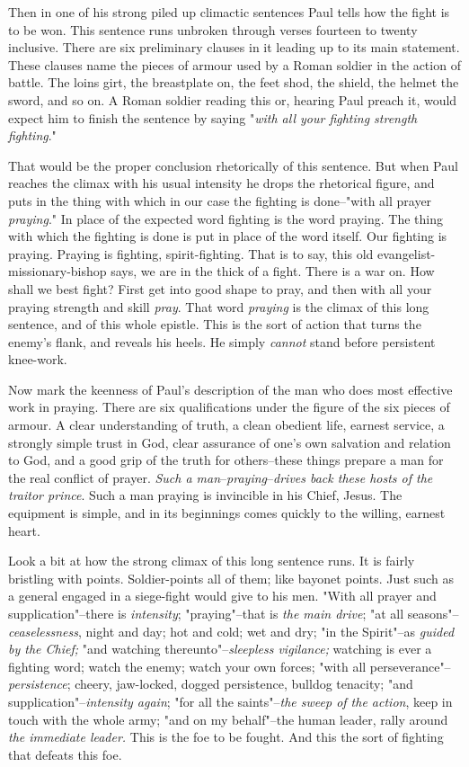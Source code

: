 Then in one of his strong piled up climactic sentences Paul tells how the
fight is to be won. This sentence runs unbroken through verses fourteen to
twenty inclusive. There are six preliminary clauses in it leading up to
its main statement. These clauses name the pieces of armour used by a
Roman soldier in the action of battle. The loins girt, the breastplate on,
the feet shod, the shield, the helmet the sword, and so on. A Roman
soldier reading this or, hearing Paul preach it, would expect him to
finish the sentence by saying "\textit{with all your fighting strength
fighting}."

That would be the proper conclusion rhetorically of this sentence. But
when Paul reaches the climax with his usual intensity he drops the
rhetorical figure, and puts in the thing with which in our case the
fighting is done--"with all prayer \textit{praying}." In place of the
expected word fighting is the word praying. The thing with which the
fighting is done is put in place of the word itself. Our fighting is
praying. Praying is fighting, spirit-fighting. That is to say, this old
evangelist-missionary-bishop says, we are in the thick of a fight. There
is a war on. How shall we best fight? First get into good shape to pray,
and then with all your praying strength and skill \textit{pray}. That word
\textit{praying} is the climax of this long sentence, and of this whole epistle.
This is the sort of action that turns the enemy's flank, and reveals his
heels. He simply \textit{cannot} stand before persistent knee-work.

Now mark the keenness of Paul's description of the man who does most
effective work in praying. There are six qualifications under the figure
of the six pieces of armour. A clear understanding of truth, a clean
obedient life, earnest service, a strongly simple trust in God, clear
assurance of one's own salvation and relation to God, and a good grip of
the truth for others--these things prepare a man for the real conflict of
prayer. \textit{Such a man}--\textit{praying}--\textit{drives back these hosts of the traitor
prince}. Such a man praying is invincible in his Chief, Jesus. The
equipment is simple, and in its beginnings comes quickly to the willing,
earnest heart.

Look a bit at how the strong climax of this long sentence runs. It is
fairly bristling with points. Soldier-points all of them; like bayonet
points. Just such as a general engaged in a siege-fight would give to his
men. "With all prayer and supplication"--there is \textit{intensity};
"praying"--that is \textit{the main drive}; "at all seasons"--\textit{ceaselessness},
night and day; hot and cold; wet and dry; "in the Spirit"--as \textit{guided by
the Chief;} "and watching thereunto"--\textit{sleepless vigilance;} watching is
ever a fighting word; watch the enemy; watch your own forces; "with all
perseverance"--\textit{persistence}; cheery, jaw-locked, dogged persistence,
bulldog tenacity; "and supplication"--\textit{intensity again}; "for all the
saints"--\textit{the sweep of the action}, keep in touch with the whole army;
"and on my behalf"--the human leader, rally around \textit{the immediate leader.}
This is the foe to be fought. And this the sort of fighting that defeats
this foe.



